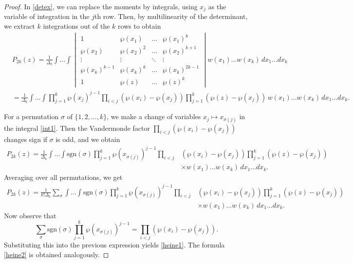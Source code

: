 \documentclass[11pt,a4paper]{article}
\theoremstyle{definition}
\numberwithin{equation}{section}
\numberwithin{theorem}{section}
\begin{document}
\begin{proof}
In \eqref{detex}, we can replace the moments by integrals, using \( x_j \) as the variable of integration in the \( j \)th row. Then, by multilinearity of the determinant, we extract \( k \) integrations out of the \( k \) rows to obtain
\begin{equation}\label{int1}
\begin{aligned}
   & P_{2k}(z) = \frac{1}{\Delta_{k}} \int \dots \int 
    \begin{vmatrix}
        1 & \wp(x_1) & \dots & \wp(x_1)^k \\
        \wp(x_2) & \wp(x_2)^2 & \dots & \wp(x_2)^{k+1} \\
        \vdots & \vdots & \ddots & \vdots \\
        \wp(x_k)^{k-1} & \wp(x_k)^k & \dots & \wp(x_k)^{2k-1} \\
        1 & \wp(z) & \dots & \wp(z)^k
    \end{vmatrix}
    w(x_1) \dots w(x_k)\, dx_1 \dots dx_k \\
    &= \frac{1}{\Delta_{k}} \int \dots \int 
    \prod_{j=1}^{k} \wp(x_j)^{j-1} 
    \prod_{i<j} \left( \wp(x_i) - \wp(x_j) \right)
    \prod_{j=1}^{k} \left( \wp(z) - \wp(x_j) \right)\,
    w(x_1) \dots w(x_k)\, dx_1 \dots dx_k.
\end{aligned}
\end{equation}

For a permutation \( \sigma \) of \( \{1,2,\dots,k\} \), we make a change of variables \( x_j \mapsto x_{\sigma(j)} \) in the integral \eqref{int1}. Then the Vandermonde factor \( \prod_{i<j} (\wp(x_i) - \wp(x_j)) \) changes sign if \( \sigma \) is odd, and we obtain
\begin{equation}
\begin{aligned}
    P_{2k}(z) = \frac{1}{\Delta_{k}} \int \dots \int 
    \mathrm{sgn}(\sigma) \prod_{j=1}^{k} \wp(x_{\sigma(j)})^{j-1}
    \prod_{i<j}& (\wp(x_i) - \wp(x_j))
    \prod_{j=1}^{k} (\wp(z) - \wp(x_j))\,
   \\& \times w(x_1) \dots w(x_k)\, dx_1 \dots dx_k.
\end{aligned}
\end{equation}
Averaging over all permutations, we get
\begin{equation}
\begin{aligned}
    P_{2k}(z) = \frac{1}{k! \Delta_{k}} \sum_{\sigma} \int \dots \int 
    \mathrm{sgn}(\sigma) \prod_{j=1}^{k} \wp(x_{\sigma(j)})^{j-1}
    \prod_{i<j}& (\wp(x_i) - \wp(x_j))
    \prod_{j=1}^{k} (\wp(z) - \wp(x_j))\,
    \\&\times w(x_1) \dots w(x_k)\, dx_1 \dots dx_k.
\end{aligned}
\end{equation}
Now observe that
\[
    \sum_{\sigma} \mathrm{sgn}(\sigma) \prod_{j=1}^{k} \wp(x_{\sigma(j)})^{j-1} 
    = \prod_{i<j} (\wp(x_i) - \wp(x_j)).
\]
Substituting this into the previous expression yields \eqref{heine1}. The formula \eqref{heine2} is obtained analogously.
\end{proof}
\end{document}
